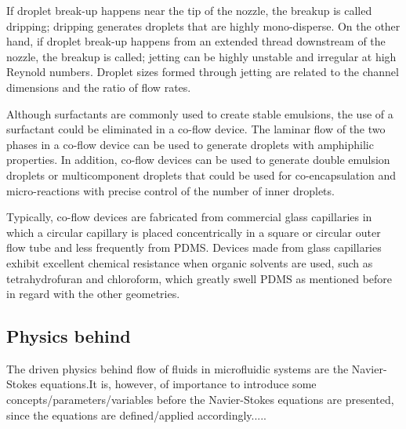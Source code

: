 \noindent If droplet break-up happens near the tip of the nozzle, the breakup is called dripping; dripping generates droplets that are highly mono-disperse.  On the other hand, if droplet break-up happens from an extended thread downstream of the nozzle, the breakup is called; jetting can be highly unstable and irregular at high Reynold numbers. Droplet sizes formed through jetting are related to the channel dimensions and the ratio of flow rates. \parencite{Zhu2017, Pit2015}

Although surfactants are commonly used to create stable emulsions, the use of a surfactant could be eliminated in a co-flow device. The laminar flow of the two phases in a co-flow device can be used to generate droplets with amphiphilic properties. In addition, co-flow devices can be used to generate double emulsion droplets or multicomponent droplets that could be used for co-encapsulation and micro-reactions with precise control of the number of inner droplets. \parencite{Zhu2017,Cole2015}

Typically, co-flow devices are fabricated from commercial glass capillaries in which a circular capillary is placed concentrically in a square or circular outer flow tube and less frequently from PDMS. Devices made from glass capillaries exhibit excellent chemical resistance when organic solvents are used, such as tetrahydrofuran and chloroform, which greatly swell PDMS as mentioned before in regard with the other geometries. \parencite{Zhu2017, Pit2015,Cole2015} 

\subsection{Physics behind}

The driven physics behind flow of fluids in microfluidic systems are the Navier-Stokes equations.It is, however, of importance to introduce some concepts/parameters/variables before the Navier-Stokes equations are presented, since the equations are defined/applied accordingly.....



